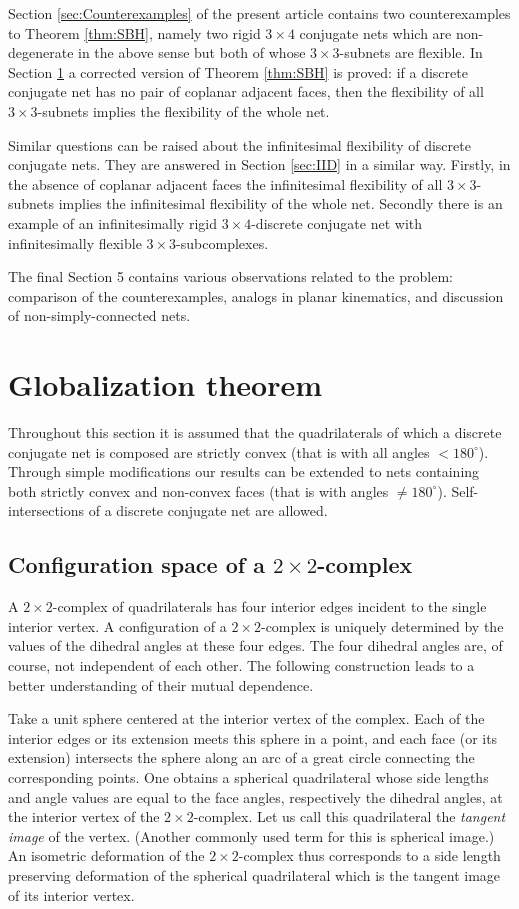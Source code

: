 \documentclass{amsart}
\theoremstyle{definition}
\begin{document}
Section \ref{sec:Counterexamples} of the present article contains two counterexamples to Theorem \ref{thm:SBH}, namely two rigid $3 \times 4$ conjugate nets which are non-degenerate in the above sense but both of whose $3 \times 3$-subnets are flexible.
In Section \ref{sec:Globalization} a corrected version of Theorem \ref{thm:SBH} is proved: if a discrete conjugate net has no pair of coplanar adjacent faces, then the flexibility of all $3 \times 3$-subnets implies the flexibility of the whole net.

Similar questions can be raised about the infinitesimal flexibility of discrete conjugate nets.
They are answered in Section \ref{sec:IID} in a similar way.
Firstly, in the absence of coplanar adjacent faces the infinitesimal flexibility of all $3 \times 3$-subnets implies the infinitesimal flexibility of the whole net.
Secondly there is an example of an infinitesimally rigid $3 \times 4$-discrete conjugate net with infinitesimally flexible $3 \times 3$-subcomplexes.

The final Section 5 contains various observations related to the problem: comparison of the counterexamples, analogs in planar kinematics, and discussion of non-simply-connected nets.


\section{Globalization theorem}
\label{sec:Globalization}
Throughout this section it is assumed that the quadrilaterals of which a discrete conjugate net is composed are strictly convex (that is with all angles $< 180^\circ$).
Through simple modifications our results can be extended to nets containing both strictly convex and non-convex faces (that is with angles $\ne 180^\circ$).
Self-intersections of a discrete conjugate net are allowed.

\subsection{Configuration space of a $2 \times 2$-complex}
A $2 \times 2$-complex of quadrilaterals has four interior edges incident to the single interior vertex.
A configuration of a $2 \times 2$-complex is uniquely determined by the values of the dihedral angles at these four edges.
The four dihedral angles are, of course, not independent of each other.
The following construction leads to a better understanding of their mutual dependence.

Take a unit sphere centered at the interior vertex of the complex.
Each of the interior edges or its extension meets this sphere in a point, and each face (or its extension) intersects the sphere along an arc of a great circle connecting the corresponding points.
One obtains a spherical quadrilateral whose side lengths and angle values are equal to the face angles, respectively the dihedral angles, at the interior vertex of the $2\times 2$-complex.
Let us call this quadrilateral the \emph{tangent image} of the vertex.
(Another commonly used term for this is spherical image.)
An isometric deformation of the $2 \times 2$-complex thus corresponds to a side length preserving deformation of the spherical quadrilateral which is the tangent image of its interior vertex.
\end{document}
